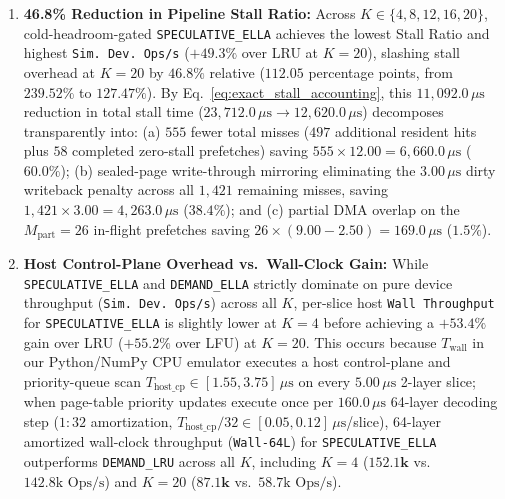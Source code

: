\documentclass[conference,10pt]{IEEEtran}
\begin{document}
\begin{enumerate}
$28.31 \pm 0.38\%$ ($127.34\%$) at canonical $p_{\text{err}} = 12.8\%$, $26.74 \pm 0.41\%$ ($130.45\%$) at $p_{\text{err}} = 25\%$, and $25.48 \pm 0.43\%$ ($133.90\%$, converging smoothly to \texttt{DEMAND\_ELLA}'s $25.30\% / 134.46\%$) at $p_{\text{err}} = 40\%$. Crucially, when concurrency reaches $K = 20$ on the canonical homogeneous trace, the recurring hot working set expands to $16 + 20 \times 4.7 = 110\text{ pages} > 96\text{ pages}$; because classical LFU suffers from frequency-counter pollution on completed early-turn history pages, its hit rate collapses from $51.39\%$ to $1.21\%$ (and LRU collapses to $0.20\%$; under heterogeneous per-stream working sets of $3.0\text{--}7.5$ pages in Table~\ref{tab:generalization_sensitivity}, LFU's transition smooths to $8.45 \pm 0.52\%$, while \texttt{SPECULATIVE\_ELLA} retains a $+19.80$ percentage point lead at $\mathbf{28.25 \pm 0.44\%}$).
    \item \textbf{46.8\% Reduction in Pipeline Stall Ratio:} Across $K \in \{4, 8, 12, 16, 20\}$, cold-headroom-gated \texttt{SPECULATIVE\_ELLA} achieves the lowest Stall Ratio and highest \texttt{Sim.\ Dev.\ Ops/s} ($+49.3\%$ over LRU at $K=20$), slashing stall overhead at $K=20$ by $46.8\%$ relative ($112.05$ percentage points, from $239.52\%$ to $127.47\%$). By Eq.~\eqref{eq:exact_stall_accounting}, this $11{,}092.0\,\mu\text{s}$ reduction in total stall time ($23{,}712.0\,\mu\text{s} \to 12{,}620.0\,\mu\text{s}$) decomposes transparently into: (a) $555$ fewer total misses ($497$ additional resident hits plus $58$ completed zero-stall prefetches) saving $555 \times 12.00 = 6{,}660.0\,\mu\text{s}$ ($60.0\%$); (b) sealed-page write-through mirroring eliminating the $3.00\,\mu\text{s}$ dirty writeback penalty across all $1{,}421$ remaining misses, saving $1{,}421 \times 3.00 = 4{,}263.0\,\mu\text{s}$ ($38.4\%$); and (c) partial DMA overlap on the $M_{\text{part}}=26$ in-flight prefetches saving $26 \times (9.00 - 2.50) = 169.0\,\mu\text{s}$ ($1.5\%$).
    \item \textbf{Host Control-Plane Overhead vs.\ Wall-Clock Gain:} While \texttt{SPECULATIVE\_ELLA} and \texttt{DEMAND\_ELLA} strictly dominate on pure device throughput (\texttt{Sim.\ Dev.\ Ops/s}) across all $K$, per-slice host \texttt{Wall Throughput} for \texttt{SPECULATIVE\_ELLA} is slightly lower at $K=4$ before achieving a $+53.4\%$ gain over LRU ($+55.2\%$ over LFU) at $K=20$. This occurs because $T_{\text{wall}}$ in our Python/NumPy CPU emulator executes a host control-plane and priority-queue scan $T_{\text{host\_cp}} \in [1.55, 3.75]\,\mu\text{s}$ on every $5.00\,\mu\text{s}$ 2-layer slice; when page-table priority updates execute once per $160.0\,\mu\text{s}$ 64-layer decoding step ($1:32$ amortization, $T_{\text{host\_cp}}/32 \in [0.05, 0.12]\,\mu\text{s}$/slice), 64-layer amortized wall-clock throughput (\texttt{Wall-64L}) for \texttt{SPECULATIVE\_ELLA} outperforms \texttt{DEMAND\_LRU} across all $K$, including $K=4$ ($\mathbf{152.1\text{k}}$ vs.\ $142.8\text{k Ops/s}$) and $K=20$ ($\mathbf{87.1\text{k}}$ vs.\ $58.7\text{k Ops/s}$).

\end{enumerate}
\end{document}
